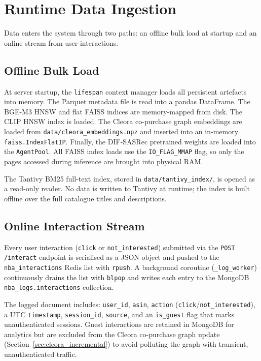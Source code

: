 \section{Runtime Data Ingestion}
\label{sec:app_ingestion}

Data enters the system through two paths: an offline bulk load at startup and an online stream from user interactions.

\subsection{Offline Bulk Load}

At server startup, the \texttt{lifespan} context manager loads all persistent artefacts into memory.
The Parquet metadata file is read into a pandas DataFrame.
The BGE-M3 HNSW and flat FAISS indices are memory-mapped from disk.
The CLIP HNSW index is loaded.
The Cleora co-purchase graph embeddings are loaded from \nolinkurl{data/cleora_embeddings.npz} and inserted into an in-memory \texttt{faiss.IndexFlatIP}.
Finally, the DIF-SASRec pretrained weights are loaded into the \texttt{AgentPool}.
All FAISS index loads use the \texttt{IO\_FLAG\_MMAP} flag, so only the pages accessed during inference are brought into physical RAM.

The Tantivy BM25 full-text index, stored in \nolinkurl{data/tantivy_index/}, is opened as a read-only reader.
No data is written to Tantivy at runtime; the index is built offline over the full catalogue titles and descriptions.

\subsection{Online Interaction Stream}

Every user interaction (\texttt{click} or \texttt{not\_interested}) submitted via the \texttt{POST /interact} endpoint is serialised as a JSON object and pushed to the \texttt{nba\_interactions} Redis list with \texttt{rpush}.
A background coroutine (\texttt{\_log\_worker}) continuously drains the list with \texttt{blpop} and writes each entry to the MongoDB \texttt{nba\_logs.interactions} collection.

The logged document includes: \texttt{user\_id}, \texttt{asin}, \texttt{action} (\texttt{click}/\texttt{not\_interested}), a UTC \texttt{timestamp}, \texttt{session\_id}, \texttt{source}, and an \texttt{is\_guest} flag that marks unauthenticated sessions.
Guest interactions are retained in MongoDB for analytics but are excluded from the Cleora co-purchase graph update (Section~\ref{sec:cleora_incremental}) to avoid polluting the graph with transient, unauthenticated traffic.


